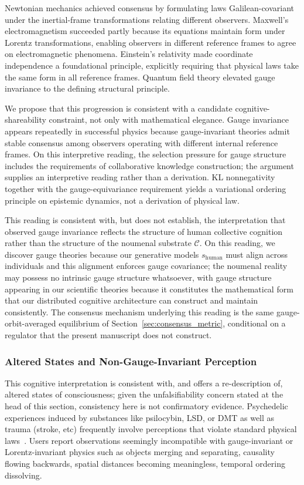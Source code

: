 \documentclass[11pt]{article}
\begin{document}
Newtonian mechanics achieved consensus by formulating laws Galilean-covariant under the inertial-frame transformations relating different observers. Maxwell's electromagnetism succeeded partly because its equations maintain form under Lorentz transformations, enabling observers in different reference frames to agree on electromagnetic phenomena. Einstein's relativity made coordinate independence a foundational principle, explicitly requiring that physical laws take the same form in all reference frames. Quantum field theory elevated gauge invariance to the defining structural principle.

We propose that this progression is consistent with a candidate cognitive-shareability constraint, not only with mathematical elegance. Gauge invariance appears repeatedly in successful physics because gauge-invariant theories admit stable consensus among observers operating with different internal reference frames. On this interpretive reading, the selection pressure for gauge structure includes the requirements of collaborative knowledge construction; the argument supplies an interpretive reading rather than a derivation. KL nonnegativity together with the gauge-equivariance requirement yields a variational ordering principle on epistemic dynamics, not a derivation of physical law.

This reading is consistent with, but does not establish, the interpretation that observed gauge invariance reflects the structure of human collective cognition rather than the structure of the noumenal substrate $\mathcal{C}$. On this reading, we discover gauge theories because our generative models $s_{\text{human}}$ must align across individuals and this alignment enforces gauge covariance; the noumenal reality may possess no intrinsic gauge structure whatsoever, with gauge structure appearing in our scientific theories because it constitutes the mathematical form that our distributed cognitive architecture can construct and maintain consistently. The consensus mechanism underlying this reading is the same gauge-orbit-averaged equilibrium of Section~\ref{sec:consensus_metric}, conditional on a regulator that the present manuscript does not construct.

\subsubsection{Altered States and Non-Gauge-Invariant Perception}

This cognitive interpretation is consistent with, and offers a re-description of, altered states of consciousness; given the unfalsifiability concern stated at the head of this section, consistency here is not confirmatory evidence. Psychedelic experiences induced by substances like psilocybin, LSD, or DMT as well as trauma (stroke, etc) frequently involve perceptions that violate standard physical laws~\cite{Carhart-Harris2014, Swanson2018, CarhartHarrisFriston2019}. Users report observations seemingly incompatible with gauge-invariant or Lorentz-invariant physics such as objects merging and separating, causality flowing backwards, spatial distances becoming meaningless, temporal ordering dissolving.
\end{document}
